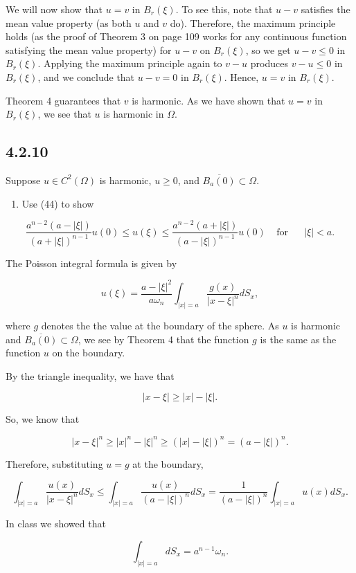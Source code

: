\documentclass{article}
\begin{document}
We will now show that $u=v$ in $B_r(\xi)$. To see this, note that $u-v$ satisfies the mean value property (as both $u$ and $v$ do). Therefore, the maximum principle holds (as the proof of Theorem 3 on page 109 works for any continuous function satisfying the mean value property) for $u-v$ on $B_r(\xi)$, so we get $u-v\leq 0$ in $B_r(\xi)$. Applying the maximum principle again to $v-u$ produces $v-u\leq 0$ in $B_r(\xi)$, and we conclude that $u-v=0$ in $B_r(\xi)$. Hence, $u=v$ in $B_r(\xi)$.

Theorem 4 guarantees that $v$ is harmonic. As we have shown that $u=v$ in $B_r(\xi)$, we see that $u$ is harmonic in $\Omega$.

\subsection{\textbf{4.2.10}} Suppose $u\in C^2(\Omega)$ is harmonic, $u\geq 0$, and $\overline{B_a(0)}\subset \Omega.$

\begin{enumerate}[label=(\alph*)]
    \item Use (44) to show
\end{enumerate}

$$\frac{a^{n-2}(a-|\xi|)}{(a+|\xi|)^{n-1}}u(0)\leq u(\xi) \leq \frac{a^{n-2}(a+|\xi|)}{(a-|\xi|)^{n-1}}u(0)~~~~~\text{for ~~~ $|\xi| < a$}.$$

The Poisson integral formula is given by

$$u(\xi)=\frac{a-|\xi|^2}{a\omega_n}\int_{|x|=a}\frac{g(x)}{|x-\xi|^n}dS_x,$$

where $g$ denotes the the value at the boundary of the sphere. As $u$ is harmonic and $\overline{B_a(0)}\subset \Omega$, we see by Theorem 4 that the function $g$ is the same as the function $u$ on the boundary.

By the triangle inequality, we have that

$$|x-\xi| \geq |x|-|\xi|.$$

So, we know that

$$|x-\xi|^n \geq |x|^n -|\xi|^n \geq (|x| -|\xi|)^n = (a-|\xi|)^n.$$

Therefore, substituting $u=g$ at the boundary,

$$\int_{|x|=a}\frac{u(x)}{|x-\xi|^n}dS_x \leq \int_{|x|=a}\frac{u(x)}{(a-|\xi|)^n}dS_x = 
\frac{1}{(a-|\xi|)^n}\int_{|x|=a}u(x)dS_x .$$

In class we showed that

$$\int_{|x|=a}dS_x = a^{n-1}\omega_n.$$
\end{document}
